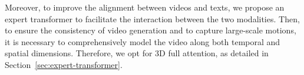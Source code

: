 {Moreover, to improve the alignment between videos and texts, we propose an expert transformer to facilitate the interaction between the two modalities. Then, to ensure the consistency of video generation and to capture large-scale motions, it is necessary to comprehensively model the video along both temporal and spatial dimensions. Therefore, we opt for 3D full attention, as detailed in Section~\ref{sec:expert-transformer}.



}